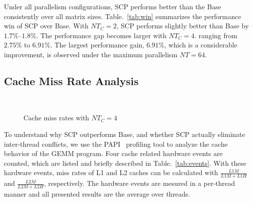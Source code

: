 Under all parallelism configurations, 
SCP performs better than the Base
consistently over all matrix sizes.
Table.~\ref{tab:win} summarizes the performance win of SCP over Base.
With $NT_C=2$, SCP performs slightly better than Base
by $1.7\%$--$1.8\%$.
The performance gap becomes larger with $NT_C=4$.
ranging from $2.75\%$ to $6.91\%$.
The largest performance gain, $6.91\%$, which is a considerable improvement,
is observed under the maximum parallelism $NT=64$.



\subsection{Cache Miss Rate Analysis}\label{subsec:analysis}

\begin{figure}
  \centering
  \\
  \caption{Cache miss rates with $NT_C=4$}
  \label{fig:papi}
\end{figure}

To understand why SCP outperforms Base,
and whether SCP actually eliminate inter-thread conflicts,
we use the PAPI~\cite{papi} profiling tool to
analyze the cache behavior of the GEMM program.
Four cache related hardware events are counted,
which are listed and briefly described in Table.~\ref{tab:events}.
With these hardware events,
miss rates of L1 and L2 caches can be calculated with
$\frac{L1M}{L1M+L1H}$ and $\frac{L2M}{L2M+L2H}$, respectively.
The hardware events are mesured in a per-thread manner
and all presented results are the average over threads.

